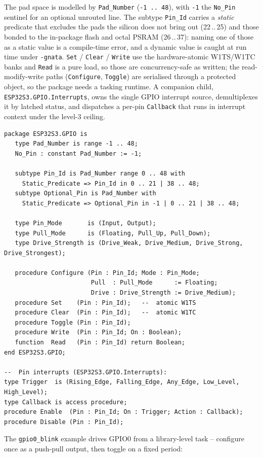 The pad space is modelled by \texttt{Pad\_Number} (\texttt{-1\,..\,48}), with
\texttt{-1} the \texttt{No\_Pin} sentinel for an optional unrouted line. The
subtype \texttt{Pin\_Id} carries a \emph{static} predicate that excludes the
pads the silicon does not bring out (22\,..\,25) and those bonded to the
in-package flash and octal PSRAM (26\,..\,37): naming one of those as a static
value is a compile-time error, and a dynamic value is caught at run time under
\texttt{-gnata}. \texttt{Set} / \texttt{Clear} / \texttt{Write} use the
hardware-atomic W1TS/W1TC banks and \texttt{Read} is a pure load, so those are
concurrency-safe as written; the read-modify-write paths (\texttt{Configure},
\texttt{Toggle}) are serialised through a protected object, so the package needs
a tasking runtime. A companion child, \texttt{ESP32S3.GPIO.Interrupts}, owns the
single GPIO interrupt source, demultiplexes it by latched status, and dispatches
a per-pin \texttt{Callback} that runs in interrupt context under the level-3
ceiling.

\begin{lstlisting}
package ESP32S3.GPIO is
   type Pad_Number is range -1 .. 48;
   No_Pin : constant Pad_Number := -1;

   subtype Pin_Id is Pad_Number range 0 .. 48 with
     Static_Predicate => Pin_Id in 0 .. 21 | 38 .. 48;
   subtype Optional_Pin is Pad_Number with
     Static_Predicate => Optional_Pin in -1 | 0 .. 21 | 38 .. 48;

   type Pin_Mode       is (Input, Output);
   type Pull_Mode      is (Floating, Pull_Up, Pull_Down);
   type Drive_Strength is (Drive_Weak, Drive_Medium, Drive_Strong, Drive_Strongest);

   procedure Configure (Pin : Pin_Id; Mode : Pin_Mode;
                        Pull  : Pull_Mode      := Floating;
                        Drive : Drive_Strength := Drive_Medium);
   procedure Set    (Pin : Pin_Id);   --  atomic W1TS
   procedure Clear  (Pin : Pin_Id);   --  atomic W1TC
   procedure Toggle (Pin : Pin_Id);
   procedure Write  (Pin : Pin_Id; On : Boolean);
   function  Read   (Pin : Pin_Id) return Boolean;
end ESP32S3.GPIO;

--  Pin interrupts (ESP32S3.GPIO.Interrupts):
type Trigger  is (Rising_Edge, Falling_Edge, Any_Edge, Low_Level, High_Level);
type Callback is access procedure;
procedure Enable  (Pin : Pin_Id; On : Trigger; Action : Callback);
procedure Disable (Pin : Pin_Id);
\end{lstlisting}

The \texttt{gpio0\_blink} example drives GPIO0 from a library-level task --
configure once as a push-pull output, then toggle on a fixed period:

